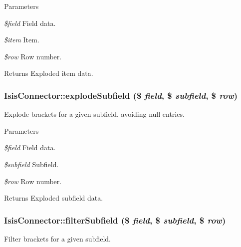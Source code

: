 \begin{DoxyParams}{Parameters}
\item[{\em \$field}]Field data.\item[{\em \$item}]Item.\item[{\em \$row}]Row number.\end{DoxyParams}
\begin{DoxyReturn}{Returns}
Exploded item data. 
\end{DoxyReturn}
\hypertarget{classIsisConnector_afc97554b42b8b9e98f396811bbfa13d8}{
\subsubsection[{explodeSubfield}]{\setlength{\rightskip}{0pt plus 5cm}IsisConnector::explodeSubfield (\$ {\em field}, \/  \$ {\em subfield}, \/  \$ {\em row})}}
\label{classIsisConnector_afc97554b42b8b9e98f396811bbfa13d8}
Explode brackets for a given subfield, avoiding null entries.


\begin{DoxyParams}{Parameters}
\item[{\em \$field}]Field data.\item[{\em \$subfield}]Subfield.\item[{\em \$row}]Row number.\end{DoxyParams}
\begin{DoxyReturn}{Returns}
Exploded subfield data. 
\end{DoxyReturn}
\hypertarget{classIsisConnector_a8baad24b6abc2ef29d8968f353ea6dae}{
\subsubsection[{filterSubfield}]{\setlength{\rightskip}{0pt plus 5cm}IsisConnector::filterSubfield (\$ {\em field}, \/  \$ {\em subfield}, \/  \$ {\em row})}}
\label{classIsisConnector_a8baad24b6abc2ef29d8968f353ea6dae}
Filter brackets for a given subfield.


